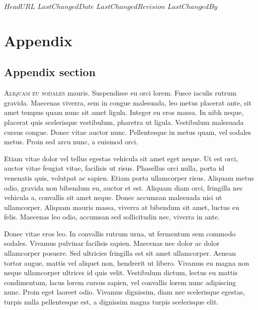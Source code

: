 \svnidlong
{$HeadURL$}
{$LastChangedDate$}
{$LastChangedRevision$}
{$LastChangedBy$}

\chapter{Appendix}

\begin{introduction}
  
\end{introduction}



\section{Appendix section}

\lettrine[findent=-5.5pt, nindent=7pt]{A}{liquam eu sodales} mauris. Suspendisse
eu orci lorem.  Fusce iaculis rutrum gravida. Maecenas viverra, sem in congue
malesuada, leo metus placerat ante, sit amet tempus quam nunc sit amet
ligula. Integer eu eros massa. In nibh neque, placerat quis scelerisque
vestibulum, pharetra ut ligula. Vestibulum malesuada cursus congue. Donec vitae
auctor nunc. Pellentesque in metus quam, vel sodales metus. Proin sed arcu nunc,
a euismod orci.

Etiam vitae dolor vel tellus egestas vehicula sit amet eget neque. Ut est orci,
auctor vitae feugiat vitae, facilisis ut risus. Phasellus orci nulla, porta id
venenatis quis, volutpat ac sapien. Etiam porta ullamcorper risus. Aliquam metus
odio, gravida non bibendum eu, auctor et est. Aliquam diam orci, fringilla nec
vehicula a, convallis sit amet neque. Donec accumsan malesuada nisi ut
ullamcorper. Aliquam mauris massa, viverra at bibendum sit amet, luctus eu
felis. Maecenas leo odio, accumsan sed sollicitudin nec, viverra in ante.

Donec vitae eros leo. In convallis rutrum urna, ut fermentum sem commodo
sodales. Vivamus pulvinar facilisis sapien. Maecenas nec dolor ac dolor
ullamcorper posuere. Sed ultricies fringilla est sit amet ullamcorper. Aenean
tortor augue, mattis vel aliquet non, hendrerit ut libero. Vivamus eu magna non
neque ullamcorper ultrices id quis velit. Vestibulum dictum, lectus eu mattis
condimentum, lacus lorem cursus sapien, vel convallis lorem nunc adipiscing
nunc. Proin eget laoreet odio. Vivamus dignissim, diam nec scelerisque egestas,
turpis nulla pellentesque est, a dignissim magna turpis scelerisque elit.


